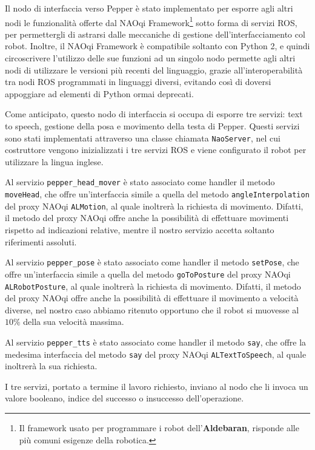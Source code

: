 Il nodo di interfaccia verso Pepper è stato implementato per esporre agli altri nodi le funzionalità offerte dal NAOqi Framework\footnote{Il framework usato per programmare i robot dell'\textbf{Aldebaran}, risponde alle più comuni esigenze della robotica.} sotto forma di servizi ROS, per permettergli di astrarsi dalle meccaniche di gestione dell'interfacciamento col robot. Inoltre, il NAOqi Framework è compatibile soltanto con Python 2, e quindi circoscrivere l'utilizzo delle sue funzioni ad un singolo nodo permette agli altri nodi di utilizzare le versioni più recenti del linguaggio, grazie all'interoperabilità tra nodi ROS programmati in linguaggi diversi, evitando così di doversi appoggiare ad elementi di Python ormai deprecati.

Come anticipato, questo nodo di interfaccia si occupa di esporre tre servizi: text to speech, gestione della posa e movimento della testa di Pepper. 
Questi servizi sono stati implementati attraverso una classe chiamata \verb|NaoServer|, nel cui costruttore vengono inizializzati i tre servizi ROS e viene configurato il robot per utilizzare la lingua inglese.

Al servizio \verb|pepper_head_mover| è stato associato come handler il metodo \verb|moveHead|, che offre un'interfaccia simile a quella del metodo \verb|angleInterpolation| del proxy NAOqi \verb|ALMotion|, al quale inoltrerà la richiesta di movimento. Difatti, il metodo del proxy NAOqi offre anche la possibilità di effettuare movimenti rispetto ad indicazioni relative, mentre il nostro servizio accetta soltanto riferimenti assoluti.

Al servizio \verb|pepper_pose| è stato associato come handler il metodo \verb|setPose|, che offre un'interfaccia simile a quella del metodo \verb|goToPosture| del proxy NAOqi \verb|ALRobotPosture|, al quale inoltrerà la richiesta di movimento. Difatti, il metodo del proxy NAOqi offre anche la possibilità di effettuare il movimento a velocità diverse, nel nostro caso abbiamo ritenuto opportuno che il robot si muovesse al $10\%$ della sua velocità massima.

Al servizio \verb|pepper_tts| è stato associato come handler il metodo \verb|say|, che offre la medesima interfaccia del metodo \verb|say| del proxy NAOqi \verb|ALTextToSpeech|, al quale inoltrerà la sua richiesta.

I tre servizi, portato a termine il lavoro richiesto, inviano al nodo che li invoca un valore booleano, indice del successo o insuccesso dell'operazione.


